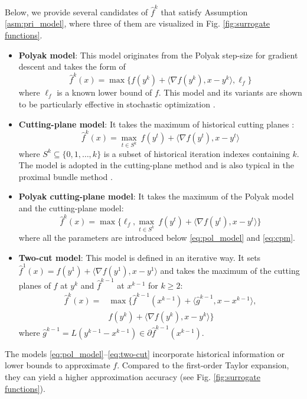 \documentclass[letterpaper, 10 pt, conference]{ieeeconf}  %
\begin{document}
Below, we provide several candidates of $\hat{f}^k$ that satisfy Assumption \ref{asm:pri_model}, where three of them are visualized in Fig. \ref{fig:surrogate functions}. 
    \begin{itemize}[leftmargin=*]
        \item \textbf{Polyak model}: This model originates from the Polyak step-size \cite{polyak1987introduction} for gradient descent and takes the form of
        \begin{equation}\label{eq:pol_model}
            \hat{f}^k(x) = \max\{f(y^k)+\langle\nabla f(y^k), x-y^k\rangle, \ell_f\}
        \end{equation}
    where $\ell_f$ is a known lower bound of $f$. This model and its variants are shown to be particularly effective in stochastic optimization \cite{wang2023generalized}.
    \item \textbf{Cutting-plane model}: It takes the maximum of historical cutting planes \cite{kelley1960cutting}:
        \begin{equation}\label{eq:cpm}
            \hat{f}^k (x) = \max_{t\in S^k}~f(y^t)+\langle \nabla f(y^t),x-y^t\rangle
        \end{equation}
        where $S^k\subseteq \{0,1,\ldots,k\}$ is a subset of historical iteration indexes containing $k$. The model is adopted in the cutting-plane method \cite{kelley1960cutting} and is also typical in the proximal bundle method \cite{cederberg2025an}.
    \item \textbf{Polyak cutting-plane model}: It takes the maximum of the Polyak model and the cutting-plane model:
        \begin{equation}\label{eq:pcpm}
            \hat{f}^k (x) = \max\{\ell_f, \max_{t\in S^k}~f(y^t)+\langle \nabla f(y^t),x-y^t\rangle\}
        \end{equation}
        where all the parameters are introduced below \eqref{eq:pol_model} and \eqref{eq:cpm}.
    \item \textbf{Two-cut model}: This model is defined in an iterative way. It sets $\hat{f}^1(x) = f(y^1)+\langle\nabla f(y^1), x-y^1\rangle$ and takes the maximum of the cutting planes of $f$ at $y^k$ and $\hat{f}^{k-1}$ at $x^{k-1}$ for $k\geq 2$:
        \begin{equation}\label{eq:two-cut}
        \begin{split}
            \hat{f}^k(x) = &\max\{\hat{f}^{k-1}(x^{k-1})+\langle \hat{g}^{k-1}, x-x^{k-1}\rangle, \\&f(y^k)+\langle \nabla f(y^k),x-y^k\rangle\}
        \end{split}
        \end{equation}
        where $\hat{g}^{k-1} = L(y^{k-1}-x^{k-1})\in \partial \hat{f}^{k-1}(x^{k-1})$.
    \end{itemize}
    The models \eqref{eq:pol_model}--\eqref{eq:two-cut} incorporate historical information or lower bounds to approximate $f$. Compared to the first-order Taylor expansion, they can yield a higher approximation accuracy (see Fig. \ref{fig:surrogate functions}).
    
\end{document}
